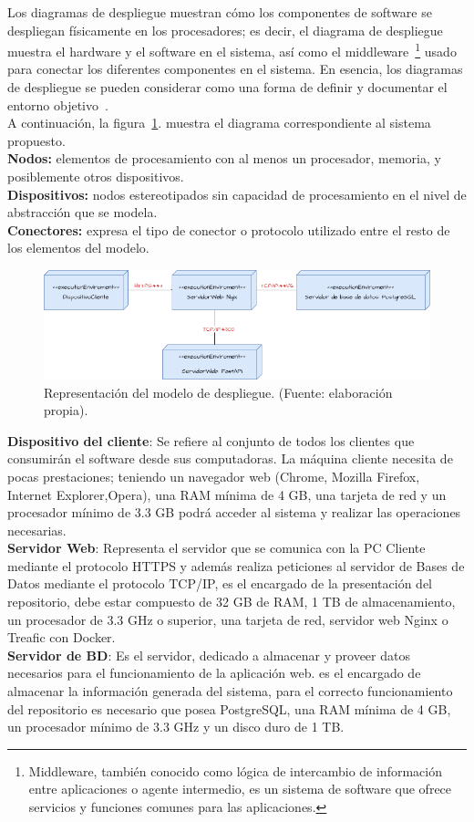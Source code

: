 Los diagramas de despliegue muestran cómo los componentes de software se despliegan
físicamente en los procesadores; es decir, el diagrama de despliegue muestra el hardware
y el software en el sistema, así como el middleware~\footnote{Middleware, también conocido como lógica de intercambio de información entre aplicaciones o agente intermedio, es un sistema de software que ofrece servicios y funciones comunes para las aplicaciones.} usado para conectar los diferentes
componentes en el sistema. En esencia, los diagramas de despliegue se pueden considerar
como una forma de definir y documentar el entorno objetivo~\cite{sommerville2011software}.\\
A continuación, la figura~\ref{fig:despliege}. muestra el diagrama correspondiente al sistema propuesto.\\
\textbf{Nodos:} elementos de procesamiento con al menos un procesador, memoria, y posiblemente otros dispositivos.\\
\textbf{Dispositivos:} nodos estereotipados sin capacidad de procesamiento en el nivel de abstracción que se modela.\\
\textbf{Conectores:} expresa el tipo de conector o protocolo utilizado entre el resto de los elementos del modelo.\\

\begin{figure}[h!]
	\centering
	\includegraphics[width=1\textwidth]{images/despliege.drawio.png}
	\caption{Representación del modelo de despliegue. (Fuente: elaboración propia).}
	\label{fig:despliege}
\end{figure}

\textbf{Dispositivo del cliente}: Se refiere al conjunto de todos los clientes que consumirán el software desde sus computadoras. La máquina cliente necesita de pocas
prestaciones; teniendo un navegador web (Chrome, Mozilla Firefox, Internet Explorer,Opera), una RAM mínima de 4 GB, una tarjeta de red y un procesador mínimo de 3.3 GB podrá acceder al sistema y realizar las operaciones necesarias.\\
\textbf{Servidor Web}: Representa el servidor que se comunica con la PC Cliente mediante el protocolo HTTPS y además realiza peticiones al servidor de Bases de Datos mediante el protocolo TCP/IP, es el encargado de la presentación del repositorio, debe estar compuesto de 32 GB de RAM, 1 TB de almacenamiento, un procesador de 3.3 GHz o superior, una tarjeta de red, servidor web Nginx o Treafic con Docker.\\
\textbf{Servidor de BD}: Es el servidor, dedicado a almacenar y proveer datos necesarios para el funcionamiento de la aplicación web. es el encargado de almacenar la información generada del
sistema, para el correcto funcionamiento del repositorio es necesario que posea PostgreSQL, una RAM mínima de 4 GB, un procesador mínimo de 3.3 GHz y un disco duro de 1 TB.

